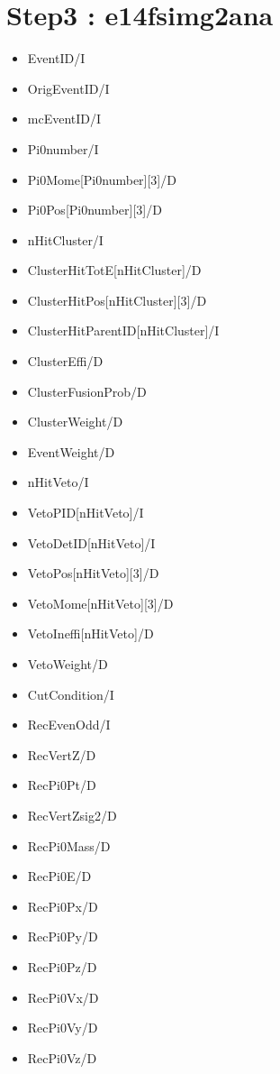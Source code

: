 \documentclass[a4paper,12pt]{article}
\begin{document}
  \section{Step3 : e14fsimg2ana}
  \begin{itemize}
   \item EventID/I
   \item OrigEventID/I
   \item mcEventID/I
   \item Pi0number/I
   \item Pi0Mome[Pi0number][3]/D
   \item Pi0Pos[Pi0number][3]/D
   \item nHitCluster/I
   \item ClusterHitTotE[nHitCluster]/D
   \item ClusterHitPos[nHitCluster][3]/D
   \item ClusterHitParentID[nHitCluster]/I
   \item ClusterEffi/D
   \item ClusterFusionProb/D
   \item ClusterWeight/D
   \item EventWeight/D
   \item nHitVeto/I
   \item VetoPID[nHitVeto]/I
   \item VetoDetID[nHitVeto]/I
   \item VetoPos[nHitVeto][3]/D
   \item VetoMome[nHitVeto][3]/D
   \item VetoIneffi[nHitVeto]/D
   \item VetoWeight/D
   \item CutCondition/I
   \item RecEvenOdd/I
   \item RecVertZ/D
   \item RecPi0Pt/D
   \item RecVertZsig2/D
   \item RecPi0Mass/D
   \item RecPi0E/D
   \item RecPi0Px/D
   \item RecPi0Py/D
   \item RecPi0Pz/D
   \item RecPi0Vx/D
   \item RecPi0Vy/D
   \item RecPi0Vz/D
  \end{itemize}
\end{document}

